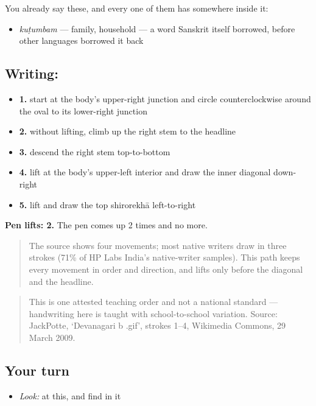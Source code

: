 You already say these, and every one of them has  somewhere inside it:

\begin{itemize}
\raggedright
  \item \textbf{} \emph{kuṭumbam} — family, household — a word Sanskrit itself borrowed, before other languages borrowed it back
\end{itemize}

\subsection*{Writing: }

\begin{itemize}
\raggedright
  \item \textbf{1.} start at the body's upper-right junction and circle counterclockwise around the oval to its lower-right junction
  \item \textbf{2.} without lifting, climb up the right stem to the headline
  \item \textbf{3.} descend the right stem top-to-bottom
  \item \textbf{4.} lift at the body's upper-left interior and draw the inner diagonal down-right
  \item \textbf{5.} lift and draw the top shirorekhā left-to-right
\end{itemize}

\textbf{Pen lifts: 2.} The pen comes up 2 times and no more.

\begin{quote}
The source shows four movements; most native writers draw  in three strokes (71\% of HP Labs India's native-writer samples). This path keeps every movement in order and direction, and lifts only before the diagonal and the headline.
\end{quote}

\begin{quote}
This is one attested teaching order and not a national standard — handwriting here is taught with school-to-school variation. Source: JackPotte, ‘Devanagari b .gif’, strokes 1–4, Wikimedia Commons, 29 March 2009.
\end{quote}

\subsection*{Your turn}
\begin{itemize}
\raggedright
  \item \emph{Look:} at this, and find  in it
\end{itemize}

